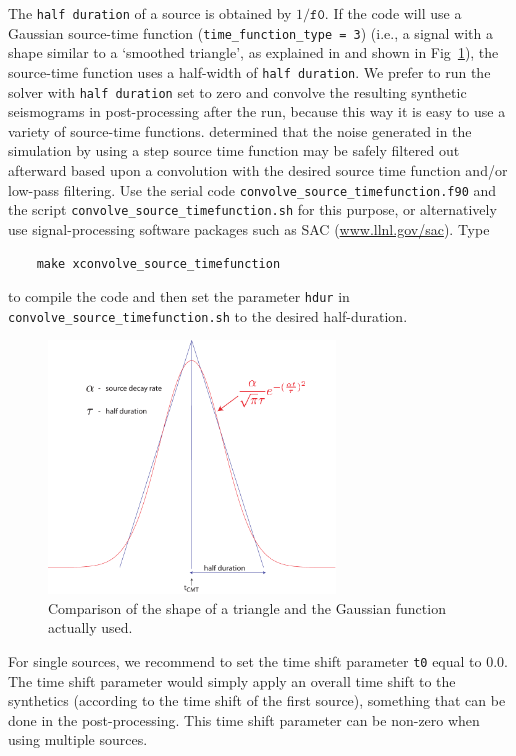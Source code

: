 \documentclass[oneside,english,onecolumn,letterpaper]{book}
\newcommand{\urlwithparentheses}[1]{(\url{#1})}
\begin{document}
\begin{description}[font=\ttfamily]
The \texttt{half duration} of a source is obtained by $1/\mathtt{f0}$.
If the code will use a Gaussian source-time function (\texttt{time\_function\_type = 3})
(i.e., a signal with a shape similar to a `smoothed triangle', as
explained in \citet{KoTr02a} and shown in Fig~\ref{fig:gauss.vs.triangle}), the
source-time function uses a half-width of \texttt{half duration}. We prefer
to run the solver with \texttt{half duration} set to zero and convolve
the resulting synthetic seismograms in post-processing after the run,
because this way it is easy to use a variety of source-time functions.
\citet{KoTr02a} determined
that the noise generated in the simulation by using a step source
time function may be safely filtered out afterward based upon a convolution
with the desired source time function and/or low-pass filtering. Use
the serial code \texttt{convolve\_source\_timefunction.f90} and the
script \texttt{convolve\_source\_timefunction.sh} for this purpose,
or alternatively use signal-processing software packages such as SAC \urlwithparentheses{www.llnl.gov/sac}.
Type
%
\begin{verbatim}
    make xconvolve_source_timefunction
\end{verbatim}
%
to compile the code and then set the parameter \texttt{hdur} in \texttt{convolve\_source\_timefunction.sh}
to the desired half-duration.
\begin{figure}[htbp]
\centering
\includegraphics[width=3in]{figures/gauss_vs_triangle_mod.pdf}
\caption{Comparison of the shape of a triangle and the Gaussian function actually
used.}
\label{fig:gauss.vs.triangle}
\end{figure}

\item[t0] For single sources, we recommend to set the time shift parameter \texttt{t0} equal to $0.0$.
The time shift parameter would simply apply
an overall time shift to the synthetics (according to the time shift of the first source), something that can be done
in the post-processing. This time shift parameter can be non-zero when using multiple sources.


\end{description}
\end{document}
